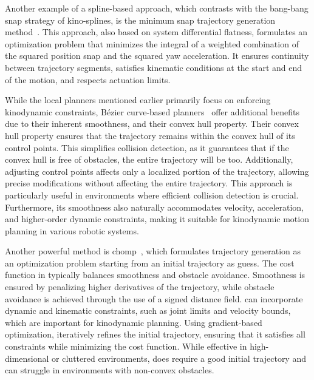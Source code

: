 Another example of a spline-based approach, which contrasts with the bang-bang snap strategy of kino-splines, is the minimum snap trajectory generation method~\cite{cMinimumSnap}. 
This approach, also based on system differential flatness, formulates an optimization problem that minimizes the integral of a weighted combination of the squared position snap and the squared yaw acceleration. 
It ensures continuity between trajectory segments, satisfies kinematic conditions at the start and end of the motion, and respects actuation limits.

While the local planners mentioned earlier primarily focus on enforcing kinodynamic constraints, Bézier curve-based planners~\cite{cBezier,cBezier2} offer additional benefits due to their inherent smoothness, and their convex hull property.
Their convex hull property ensures that the trajectory remains within the convex hull of its control points. 
This simplifies collision detection, as it guarantees that if the convex hull is free of obstacles, the entire trajectory will be too. 
Additionally, adjusting control points affects only a localized portion of the trajectory, allowing precise modifications without affecting the entire trajectory. 
This approach is particularly useful in environments where efficient collision detection is crucial.
Furthermore, its smoothness also naturally accommodates velocity, acceleration, and higher-order dynamic constraints, making it suitable for kinodynamic motion planning in various robotic systems. 

Another powerful method is \gls{chomp}~\cite{cCHOMP}, which formulates trajectory generation as an optimization problem starting from an initial trajectory as guess. 
The cost function in  typically balances smoothness and obstacle avoidance.
Smoothness is ensured by penalizing higher derivatives of the trajectory, while obstacle avoidance is achieved through the use of a signed distance field. 
 can incorporate dynamic and kinematic constraints, such as joint limits and velocity bounds, which are important for kinodynamic planning. 
Using gradient-based optimization,  iteratively refines the initial trajectory, ensuring that it satisfies all constraints while minimizing the cost function. 
While effective in high-dimensional or cluttered environments,  does require a good initial trajectory and can struggle in environments with non-convex obstacles.

